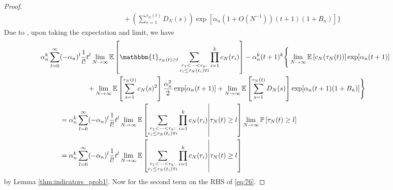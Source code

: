 \documentclass{article}
\newcommand{\Prob}{\mathbb{P}}
\newcommand{\E}{\mathbb{E}}
\newcommand{\1}[1]{\mathbbm{1}_{#1}}
\begin{document}
\begin{proof}
\begin{align}
&\qquad\qquad+ \left( \sum_{s=1}^{\tau_N(t)} D_N(s) \right)
\exp[ \alpha_n (1 + O(N^{-1}) ) (t+1) (1 + B_n) ] \Bigg\}
\end{align}
Due to \citet[Equations (3.3)--(3.5)]{brown2021}, upon taking the expectation and limit, we have
\begin{align}
\alpha_n^k \sum_{l=0}^{\infty} &(-\alpha_n)^l \frac{1}{l!} t^l 
\lim_{N\to\infty}\E \left[ \1{\tau_N(t) \geq l}
\sum_{\substack{r_1 <\dots< r_k :\\ r_i \leq \tau_N(t_i) \forall i}} \prod_{i=1}^k c_N(r_i) \right] 
- \alpha_n^k (t+1)^k
\Bigg\{ \lim_{N\to\infty}\E\left[c_N(\tau_N(t)) \right] \exp[ \alpha_n (t+1) ] \notag\\
 &\qquad\qquad+  \lim_{N\to\infty}\E\left[ \sum_{s=1}^{\tau_N(t)} c_N(s)^2 \right]
\frac{\alpha_n^2}{2} \exp[ \alpha_n (t+1) ]
+ \lim_{N\to\infty}\E\left[ \sum_{s=1}^{\tau_N(t)} D_N(s) \right]
\exp[ \alpha_n (t+1) (1 + B_n) ] \Bigg\} \notag\\
&= \alpha_n^k \sum_{l=0}^{\infty} (-\alpha_n)^l \frac{1}{l!} t^l 
\lim_{N\to\infty}\E \left[ \sum_{\substack{r_1 <\dots< r_k :\\ r_i \leq \tau_N(t_i) \forall i}} \prod_{i=1}^k c_N(r_i) \middle| \tau_N(t) \geq l \right] 
\lim_{N\to\infty}\Prob\left[ \tau_N(t) \geq l \right] \notag\\
&= \alpha_n^k \sum_{l=0}^{\infty} (-\alpha_n)^l \frac{1}{l!} t^l 
\lim_{N\to\infty}\E \left[ \sum_{\substack{r_1 <\dots< r_k :\\ r_i \leq \tau_N(t_i) \forall i}} \prod_{i=1}^k c_N(r_i) \middle| \tau_N(t) \geq l \right] \label{eq:78a}
\end{align}
by Lemma \ref{thm:indicators_prob1}.
Now for the second term on the RHS of \eqref{eq:76}.

\end{proof}
\end{document}
